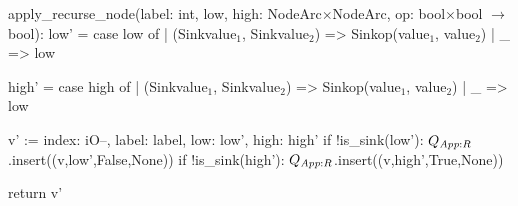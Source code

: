 \begin{blstlisting}
  apply_recurse_node(label: int,
                     low, high: NodeArc$\times$NodeArc,
                     op: bool$\times$bool $\rightarrow$ bool):
        low' = case low of
               | (Sink{value$_1$}, Sink{value$_2$}) => Sink{op(value$_1$, value$_2$)}
               | _ => low

        high' = case high of
                | (Sink{value$_1$}, Sink{value$_2$}) => Sink{op(value$_1$, value$_2$)}
                | _ => low

         v' := { index: iO--, label: label, low: low', high: high' }
         if !is_sink(low'): $\ApplyQrec$.insert((v,low',False,None))
         if !is_sink(high'): $\ApplyQrec$.insert((v,high',True,None))

         return v'
\end{blstlisting}
